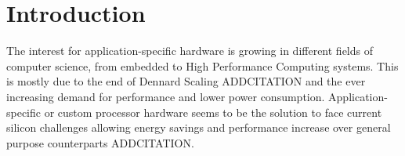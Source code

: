 \section{Introduction}
The interest for application-specific hardware is growing in different fields of computer science, from embedded to High Performance Computing systems. This is mostly due to the end of Dennard Scaling ADDCITATION
and the ever increasing demand for performance and lower power consumption. Application-specific or custom processor hardware seems to be the solution to face current silicon challenges allowing energy savings and performance increase over general purpose counterparts ADDCITATION.  
%

